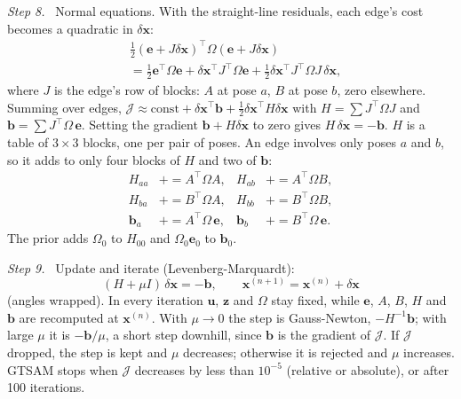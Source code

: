 \documentclass[letterpaper, 10pt, conference]{ieeeconf}
\newcommand{\x}{\mathbf{x}}
\newcommand{\step}[1]{\par\noindent\textit{Step #1.}\ }
\begin{document}
\step{8} Normal equations. With the straight-line residuals, each edge's
cost becomes a quadratic in $\delta\x$:
\begin{equation}
\begin{aligned}
&\tfrac12(\mathbf{e}+J\delta\x)^\top\Omega(\mathbf{e}+J\delta\x)\\
&=\tfrac12\mathbf{e}^\top\Omega\mathbf{e}+\delta\x^\top J^\top\Omega\mathbf{e}+\tfrac12\delta\x^\top J^\top\Omega J\,\delta\x,
\end{aligned}
\end{equation}
where $J$ is the edge's row of blocks: $A$ at pose $a$, $B$ at pose $b$,
zero elsewhere. Summing over edges,
$\mathcal{J}\approx\text{const}+\delta\x^\top\mathbf{b}+\tfrac12\delta\x^\top H\delta\x$
with $H=\sum J^\top\Omega J$ and $\mathbf{b}=\sum J^\top\Omega\,\mathbf{e}$.
Setting the gradient $\mathbf{b}+H\delta\x$ to zero gives
$H\,\delta\x=-\mathbf{b}$. $H$ is a table of $3\times3$ blocks, one per pair
of poses. An edge involves only poses $a$ and $b$, so it adds to only four
blocks of $H$ and two of $\mathbf{b}$:
\begin{equation}
\begin{aligned}
H_{aa}&\mathrel{+}=A^\top\Omega A, & H_{ab}&\mathrel{+}=A^\top\Omega B,\\
H_{ba}&\mathrel{+}=B^\top\Omega A, & H_{bb}&\mathrel{+}=B^\top\Omega B,\\
\mathbf{b}_a&\mathrel{+}=A^\top\Omega\,\mathbf{e}, & \mathbf{b}_b&\mathrel{+}=B^\top\Omega\,\mathbf{e}.
\end{aligned}
\end{equation}
The prior adds $\Omega_0$ to $H_{00}$ and $\Omega_0\mathbf{e}_0$ to $\mathbf{b}_0$.

\step{9} Update and iterate (Levenberg-Marquardt):
\begin{equation}
(H+\mu I)\,\delta\x=-\mathbf{b},\qquad \x^{(n+1)}=\x^{(n)}+\delta\x
\end{equation}
(angles wrapped). In every iteration $\mathbf{u}$, $\mathbf{z}$ and $\Omega$
stay fixed, while $\mathbf{e}$, $A$, $B$, $H$ and $\mathbf{b}$ are
recomputed at $\x^{(n)}$. With $\mu\to0$ the step is Gauss-Newton,
$-H^{-1}\mathbf{b}$; with large $\mu$ it is $-\mathbf{b}/\mu$, a short step
downhill, since $\mathbf{b}$ is the gradient of $\mathcal{J}$. If
$\mathcal{J}$ dropped, the step is kept and $\mu$ decreases; otherwise it is
rejected and $\mu$ increases. GTSAM stops when $\mathcal{J}$ decreases by
less than $10^{-5}$ (relative or absolute), or after 100 iterations.
\end{document}
